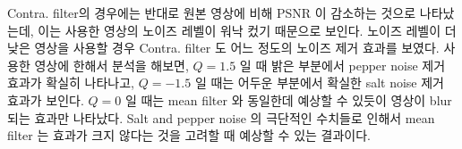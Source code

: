 \documentclass[a4paper, 12p]{paper}
\begin{document}
Contra. filter의 경우에는 반대로 원본 영상에 비해 PSNR 이 감소하는 것으로 나타났는데, 이는 사용한 영상의 노이즈 레벨이 워낙 컸기 때문으로 보인다. 노이즈 레벨이 더 낮은 영상을 사용할 경우 Contra. filter 도 어느 정도의 노이즈 제거 효과를 보였다. 사용한 영상에 한해서 분석을 해보면, $Q=1.5$ 일 때 밝은 부분에서 pepper noise 제거 효과가 확실히 나타나고, $Q=-1.5$ 일 때는 어두운 부분에서 확실한 salt noise 제거 효과가 보인다. $Q=0$ 일 때는 mean filter 와 동일한데 예상할 수 있듯이 영상이 blur 되는 효과만 나타났다. Salt and pepper noise 의 극단적인 수치들로 인해서 mean filter 는 효과가 크지 않다는 것을 고려할 때 예상할 수 있는 결과이다.

\begin{figure}[H]
\centering
{}
\end{figure}
\end{document}
